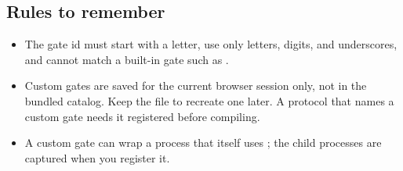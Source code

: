 \subsection{Rules to remember}
\begin{itemize}
  \item The gate id must start with a letter, use only letters, digits, and
  underscores, and cannot match a built-in gate such as .
  \item Custom gates are saved for the current browser session only, not in
  the bundled catalog. Keep the  file to recreate one later.
  A protocol that names a custom gate needs it registered before compiling.
  \item A custom gate can wrap a process that itself uses ;
  the child processes are captured when you register it.
\end{itemize}
